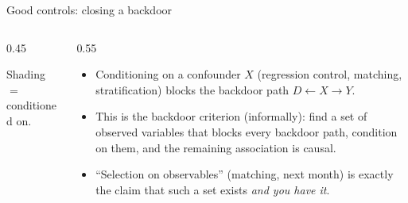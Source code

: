 \documentclass[aspectratio=169,11pt]{beamer}
\begin{document}
\begin{frame}{Good controls: closing a backdoor}
\begin{columns}
\begin{column}{0.45\textwidth}
\begin{center}
\end{center}
\smallskip
{\small Shading $=$ conditioned on.}
\end{column}
\begin{column}{0.55\textwidth}
\begin{itemize}
	\item Conditioning on a \alert{confounder} $X$ (regression control, matching,
	stratification) \alert{blocks} the backdoor path $D \leftarrow X \rightarrow Y$.

	\item This is the \alert{backdoor criterion} (informally): find a set of observed
	variables that blocks every backdoor path, condition on them, and the remaining
	association is causal.

	\item ``Selection on observables'' (matching, next month) is exactly the claim
	that such a set exists \emph{and you have it}.
\end{itemize}
\end{column}
\end{columns}
\end{frame}
\end{document}
